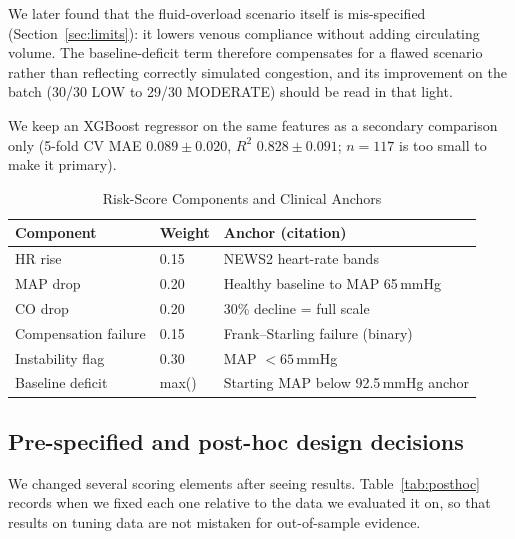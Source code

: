 \documentclass[conference]{IEEEtran}
\begin{document}
We later found that the fluid-overload scenario itself is mis-specified (Section~\ref{sec:limits}): it lowers venous compliance without adding circulating volume. The baseline-deficit term therefore compensates for a flawed scenario rather than reflecting correctly simulated congestion, and its improvement on the batch (30/30 LOW to 29/30 MODERATE) should be read in that light.

We keep an XGBoost regressor \cite{chen2016xgboost} on the same features as a secondary comparison only (5-fold CV MAE $0.089\pm0.020$, $R^2$ $0.828\pm0.091$; $n=117$ is too small to make it primary).

\begin{table}[!t]
\centering
\caption{Risk-Score Components and Clinical Anchors}
\label{tab:riskscore}
\footnotesize
\begin{tabularx}{\columnwidth}{@{}P{2.0cm}P{0.85cm}Y@{}}
\toprule
\textbf{Component} & \textbf{Weight} & \textbf{Anchor (citation)} \\
\midrule
HR rise & 0.15 & NEWS2 heart-rate bands \cite{rcp2017news2} \\
MAP drop & 0.20 & Healthy baseline to MAP 65\,mmHg \cite{vincent2013shock} \\
CO drop & 0.20 & 30\% decline = full scale \cite{nohria2002management,baran2019scai} \\
Compensation failure & 0.15 & Frank--Starling failure (binary) \\
Instability flag & 0.30 & MAP $<65$\,mmHg \cite{vincent2013shock} \\
Baseline deficit & max() & Starting MAP below 92.5\,mmHg anchor \\
\bottomrule
\end{tabularx}
\end{table}

\subsection{Pre-specified and post-hoc design decisions}
We changed several scoring elements after seeing results. Table~\ref{tab:posthoc} records when we fixed each one relative to the data we evaluated it on, so that results on tuning data are not mistaken for out-of-sample evidence.
\end{document}
